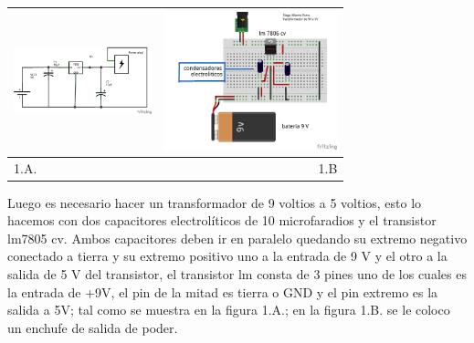 \documentclass[12]{article}
\newenvironment{Figure}
{\par\medskip\noindent\minipage{\linewidth}}
{\endminipage\par\medskip}
\begin{document}
\begin{multicols}{2}
\begin{Figure}
\center
\begin{tabular}{|l|r|}
\hline
\includegraphics[width=4cm, height=4cm]{img/esquematrans.png}  & \includegraphics[width=4.cm, height=4cm]{img/montajetr5V.png} \\ \hline
1.A. & 1.B \\ \hline
\end{tabular}
\label{fig:g1}
\end{Figure}
\vspace{0.6cm}
Luego es necesario hacer un transformador de 9 voltios a 5 voltios, esto lo hacemos con dos capacitores electrolíticos de 10 microfaradios  y el transistor lm7805\cite{REGULADOR} cv. Ambos  capacitores deben ir en paralelo quedando su extremo negativo conectado a tierra y su extremo positivo uno a la entrada de 9 V y el otro a la salida de 5 V del transistor, el transistor lm consta de 3 pines uno de los cuales es la entrada de +9V, el pin de la mitad es tierra o GND y el pin extremo es la salida a 5V; tal como se muestra en la figura 1.A.; en la figura 1.B. se le coloco un enchufe de salida de poder.



\end{multicols}
\end{document}
